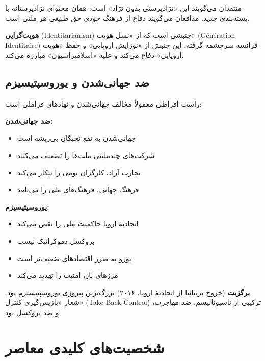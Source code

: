 منتقدان می‌گویند این «نژادپرستی بدون نژاد» است: همان محتوای نژادپرستانه با بسته‌بندی جدید. مدافعان می‌گویند دفاع از فرهنگ خودی حق طبیعی هر ملتی است.

\textbf{هویت‌گرایی} (Identitarianism) جنبشی است که از «نسل هویت» (Génération Identitaire) فرانسه سرچشمه گرفته. این جنبش از «نوزایش اروپایی» و حفظ «هویت اروپایی» دفاع می‌کند و علیه «اسلامیزاسیون» مبارزه می‌کند.


\subsection{ضد جهانی‌شدن و یوروسپتیسیزم}


راست افراطی معمولاً مخالف جهانی‌شدن و نهادهای فراملی است:

\textbf{ضد جهانی‌شدن:}
\begin{itemize}
    \item جهانی‌شدن به نفع نخبگان بی‌ریشه است
    \item شرکت‌های چندملیتی ملت‌ها را تضعیف می‌کنند
    \item تجارت آزاد، کارگران بومی را بیکار می‌کند
    \item فرهنگ جهانی، فرهنگ‌های ملی را می‌بلعد
\end{itemize}

\textbf{یوروسپتیسیزم:}
\begin{itemize}
    \item اتحادیهٔ اروپا حاکمیت ملی را نقض می‌کند
    \item بروکسل دموکراتیک نیست
    \item یورو به ضرر اقتصادهای ضعیف‌تر است
    \item مرزهای باز، امنیت را تهدید می‌کند
\end{itemize}

\textbf{برگزیت} (خروج بریتانیا از اتحادیهٔ اروپا، ۲۰۱۶) بزرگ‌ترین پیروزی یوروسپتیسیزم بود. شعار «بازپس‌گیری کنترل» (Take Back Control) ترکیبی از ناسیونالیسم، ضد مهاجرت، و ضد بروکسل بود.


\section{شخصیت‌های کلیدی معاصر}

